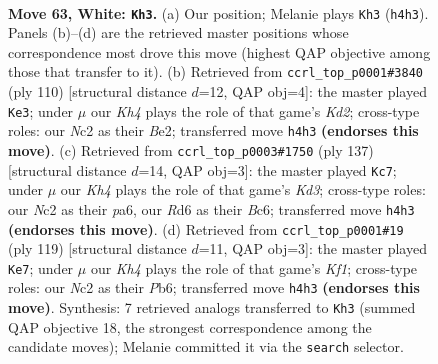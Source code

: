 \documentclass[11pt]{article}
\begin{document}
\clearpage

\begin{figure}[p]\centering
\begin{subfigure}{0.46\textwidth}\centering
\resizebox{\linewidth}{!}{%
\newchessgame
\chessboard[
  setfen={6k1/1r4b1/3R4/R7/2P4K/8/2N5/8 w - - 46 63},
  showmover=false,
  pgfstyle=straightmove, color=movearrow, markmove={h4-h3}
]}
\caption{}
\end{subfigure}\hfill
\begin{subfigure}{0.46\textwidth}\centering
\resizebox{\linewidth}{!}{%
\newchessgame
\chessboard[
  setfen={7R/5p2/8/4k3/1r2b3/8/3KB3/8 w - - 12 56},
  showmover=false,
  pgfstyle=straightmove, color=movearrow, markmove={d2-e3}
]}
\caption{}
\end{subfigure}
\\[4pt]
\begin{subfigure}{0.46\textwidth}\centering
\resizebox{\linewidth}{!}{%
\newchessgame
\chessboard[
  setfen={1R6/8/P1bk4/8/7r/KB6/8/8 b - - 2 69},
  showmover=false,
  pgfstyle=straightmove, color=movearrow, markmove={d6-c7}
]}
\caption{}
\end{subfigure}\hfill
\begin{subfigure}{0.46\textwidth}\centering
\resizebox{\linewidth}{!}{%
\newchessgame
\chessboard[
  setfen={5k2/8/1p2B3/4K3/8/8/3r4/7R b - - 10 60},
  showmover=false,
  pgfstyle=straightmove, color=movearrow, markmove={f8-e7}
]}
\caption{}
\end{subfigure}
\caption{\textbf{Move 63, White: \texttt{Kh3}.} (a) Our position; Melanie plays \texttt{Kh3} (\texttt{h4h3}). Panels (b)--(d) are the retrieved master positions whose correspondence most drove this move (highest QAP objective among those that transfer to it). (b) Retrieved from \texttt{ccrl\_top\_p0001\#3840} (ply 110) [structural distance $d$=12, QAP obj=4]: the master played \texttt{Ke3}; under $\mu$ our \emph{Kh4} plays the role of that game's \emph{Kd2}; cross-type roles: our \emph{N}c2 as their \emph{B}e2; transferred move \texttt{h4h3} \textbf{(endorses this move)}. (c) Retrieved from \texttt{ccrl\_top\_p0003\#1750} (ply 137) [structural distance $d$=14, QAP obj=3]: the master played \texttt{Kc7}; under $\mu$ our \emph{Kh4} plays the role of that game's \emph{Kd3}; cross-type roles: our \emph{N}c2 as their \emph{p}a6, our \emph{R}d6 as their \emph{B}c6; transferred move \texttt{h4h3} \textbf{(endorses this move)}. (d) Retrieved from \texttt{ccrl\_top\_p0001\#19} (ply 119) [structural distance $d$=11, QAP obj=3]: the master played \texttt{Ke7}; under $\mu$ our \emph{Kh4} plays the role of that game's \emph{Kf1}; cross-type roles: our \emph{N}c2 as their \emph{P}b6; transferred move \texttt{h4h3} \textbf{(endorses this move)}. Synthesis: 7 retrieved analogs transferred to \texttt{Kh3} (summed QAP objective 18, the strongest correspondence among the candidate moves); Melanie committed it via the \texttt{search} selector.}
\label{fig:thought-m124}
\end{figure}
\end{document}
